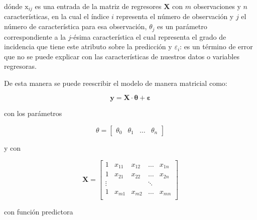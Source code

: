        dónde $\mathrm{x}_{i j}$ es una entrada de la matriz de regresores $\mathbf{X}$ con $m$ observaciones y $n$ características, en la cual el índice $i$ representa el número de observación y $j$ el número de característica para esa observación, $\theta_j$ es un parámetro correspondiente a la $j$-ésima característica el cual representa el grado de incidencia que tiene este atributo sobre la predicción y $\varepsilon_i$: es un término de error que no se puede explicar con las características de nuestros datos o variables regresoras.
        
        \noindent De esta manera se puede reescribir el modelo de manera matricial como:
        
        \begin{equation}
            \mathbf{y} = \mathbf{X}\cdot\mathbf{\theta} + \mathbf{\varepsilon}\label{eq:3}
        \end{equation}
        
        \noindent con los parámetros
        
        $$\theta = \begin{bmatrix}
        	\theta_0 & \theta_1 & \dots & \theta_n
        \end{bmatrix}$$
    
    	\noindent y con
        
        $$\mathbf{X} = \begin{bmatrix}
                        1 & x_{11} & x_{12} & \dots & x_{1n}\\
                        1 & x_{21} & x_{22} & \dots & x_{2n}\\
                        \vdots & & & \ddots & \\
                        1 & x_{m1} & x_{m2} & \dots & x_{mn}\\
                        \end{bmatrix}$$
        
        
                    
        \noindent con función predictora
        
